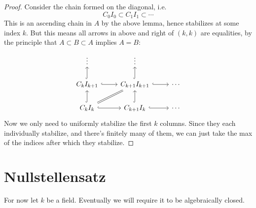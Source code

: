 \documentclass[12pt]{article}
\begin{document}
\begin{proof}
	Consider the chain formed on the diagonal, i.e. 
	\begin{equation*}
		C_0I_0\subset C_1I_1\subset\cdots
	\end{equation*}
	This is an ascending chain in $A$ by the above lemma, hence stabilizes at some index $k$. But this means all arrows in above and right of $(k,k)$ are equalities, by the principle that $A\subset B\subset A$ implies $A=B$:
	\begin{equation*}
\begin{tikzcd}
\vdots                                                                 & \vdots                                         &        \\
C_kI_{k+1} \arrow[u, hook] \arrow[r, hook]                             & C_{k+1}I_{k+1} \arrow[u, hook] \arrow[r, hook] & \cdots \\
C_kI_k \arrow[u, hook] \arrow[r, hook] \arrow[ru, Rightarrow, no head] & C_{k+1}I_k \arrow[r, hook] \arrow[u, hook]     & \cdots
\end{tikzcd}
	\end{equation*}
	Now we only need to uniformly stabilize the first $k$ columns. Since they each individually stabilize, and there's finitely many of them, we can just take the max of the indices after which they stabilize.
\end{proof}


\section{Nullstellensatz} %

For now let $k$ be a field. Eventually we will require it to be algebraically closed.
\end{document}
